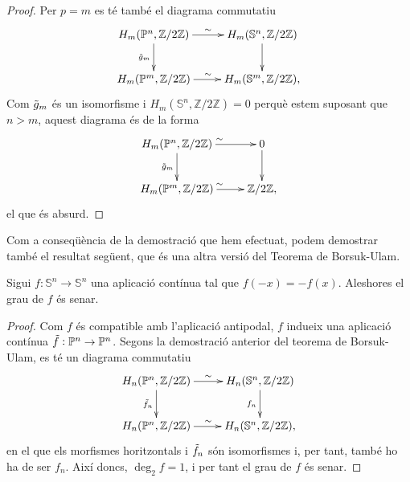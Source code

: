 \documentclass[../main.tex]{subfiles}
\begin{document}
\begin{proof}
Per $p = m$ es té també el diagrama commutatiu
\begin{equation}
    \notag
    \xymatrix{
    H_m(\mathbb{P}^n,\mathbb{Z}/2\mathbb{Z})\ar[r]^\sim\ar[d]_{\Tilde{g}_m} & H_{m}(\mathbb{S}^n,\mathbb{Z}/2\mathbb{Z})\ar[d]\\
    H_m(\mathbb{P}^m,\mathbb{Z}/2\mathbb{Z})\ar[r]^\sim & H_{m}(\mathbb{S}^m,\mathbb{Z}/2\mathbb{Z}),
    }
\end{equation}
Com $\Tilde{g}_m$ és un isomorfisme i $H_m(\mathbb{S}^n,\mathbb{Z}/2\mathbb{Z}) = 0$ perquè estem suposant que $n>m$, aquest diagrama és de la forma
\begin{equation}
    \notag
    \xymatrix{
    H_m(\mathbb{P}^n,\mathbb{Z}/2\mathbb{Z})\ar[r]^\sim\ar[d]_{\Tilde{g}_m} & 0\ar[d]\\
    H_m(\mathbb{P}^m,\mathbb{Z}/2\mathbb{Z})\ar[r]^\sim & \mathbb{Z}/2\mathbb{Z},
    }
\end{equation}
el que és absurd.
\end{proof}

Com a conseqüència de la demostració que hem efectuat, podem demostrar també el resultat següent, que és una altra versió del Teorema de Borsuk-Ulam.

\begin{coro}
 Sigui $f:\mathbb{S}^n\rightarrow \mathbb{S}^n$ una aplicació contínua tal que $f(-x) = -f(x)$. Aleshores el grau de $f$ és senar. 
\end{coro}
\begin{proof}
Com $f$ és compatible amb l'aplicació antipodal, $f$ indueix una aplicació contínua $\Tilde{f}:\mathbb{P}^n\rightarrow\mathbb{P}^n$. Segons la demostració anterior del teorema de Borsuk-Ulam, es té un diagrama commutatiu
\begin{equation}
    \notag
    \xymatrix{
    H_n(\mathbb{P}^n,\mathbb{Z}/2\mathbb{Z})\ar[r]^\sim\ar[d]_{\Tilde{f}_n} & H_{n}(\mathbb{S}^n,\mathbb{Z}/2\mathbb{Z})\ar[d]_{f_n}\\
    H_n(\mathbb{P}^n,\mathbb{Z}/2\mathbb{Z})\ar[r]^\sim & H_{n}(\mathbb{S}^n,\mathbb{Z}/2\mathbb{Z}),
    }
\end{equation}
en el que els morfismes horitzontals i $\Tilde{f}_n$ són isomorfismes i, per tant, també ho ha de ser $f_n$. Així doncs, $\deg_2f = 1$, i per tant el grau de $f$ és senar.
\end{proof}
\end{document}
